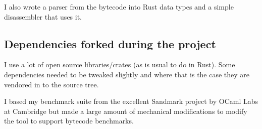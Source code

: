I also wrote a parser from the bytecode into Rust data types and a simple disassembler that uses
it.

\subsection{Dependencies forked during the project}

I use a lot of open source libraries/crates (as is usual to do in Rust). Some dependencies needed
to be
tweaked slightly and where that is the case they are vendored in to the source tree.

I based my benchmark suite from the excellent Sandmark project by OCaml Labs at Cambridge but
made a large amount of mechanical modifications to modify the tool to support bytecode
benchmarks.
